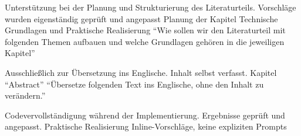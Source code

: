 
  {Unterstützung bei der Planung und Strukturierung
  	des Literaturteils. Vorschläge wurden eigenständig
  	geprüft und angepasst}
  {Planung der Kapitel Technische Grundlagen und
  	Praktische Realisierung}
  {\enquote{Wie sollen wir den Literaturteil mit folgenden Themen aufbauen und welche Grundlagen gehören in die jeweiligen Kapitel}}

  {Ausschließlich zur Übersetzung ins Englische. Inhalt selbst verfasst.}
  {Kapitel \enquote{Abstract}}
  {\enquote{Übersetze folgenden Text ins Englische, ohne den Inhalt zu verändern.}}

  {Codevervollständigung während der Implementierung. Ergebnisse geprüft und angepasst.}
  {Praktische Realisierung}
  {Inline-Vorschläge, keine expliziten Prompts}
